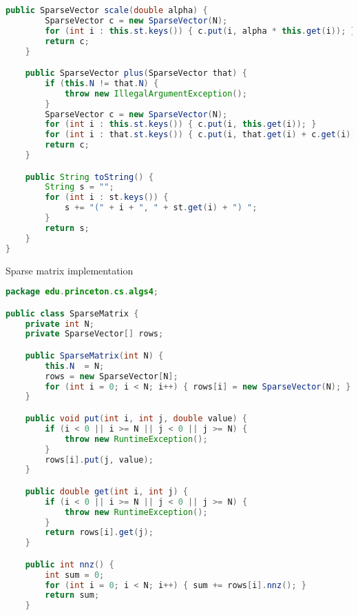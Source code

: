 \documentclass[8pt,a4paper,compress]{beamer}
\begin{document}
\begin{frame}[fragile]
\pause

\begin{lstlisting}[language=Java]
    public SparseVector scale(double alpha) {
        SparseVector c = new SparseVector(N);
        for (int i : this.st.keys()) { c.put(i, alpha * this.get(i)); }
        return c;
    }

    public SparseVector plus(SparseVector that) {
        if (this.N != that.N) {
            throw new IllegalArgumentException(); 
        }
        SparseVector c = new SparseVector(N);
        for (int i : this.st.keys()) { c.put(i, this.get(i)); }
        for (int i : that.st.keys()) { c.put(i, that.get(i) + c.get(i)); } 
        return c;
    }

    public String toString() {
        String s = "";
        for (int i : st.keys()) {
            s += "(" + i + ", " + st.get(i) + ") ";
        }
        return s;
    }
}
\end{lstlisting}
\end{frame}

\begin{frame}[fragile]
\pause

Sparse matrix implementation
\begin{lstlisting}[language=Java]
package edu.princeton.cs.algs4;

public class SparseMatrix {
    private int N; 
    private SparseVector[] rows; 

    public SparseMatrix(int N) {
        this.N  = N;
        rows = new SparseVector[N];
        for (int i = 0; i < N; i++) { rows[i] = new SparseVector(N); }
    }

    public void put(int i, int j, double value) {
        if (i < 0 || i >= N || j < 0 || j >= N) { 
            throw new RuntimeException(); 
        }
        rows[i].put(j, value);
    }

    public double get(int i, int j) {
        if (i < 0 || i >= N || j < 0 || j >= N) { 
            throw new RuntimeException(); 
        }
        return rows[i].get(j);
    }

    public int nnz() { 
        int sum = 0;
        for (int i = 0; i < N; i++) { sum += rows[i].nnz(); }
        return sum;
    }
\end{lstlisting}
\end{frame}
\end{document}
